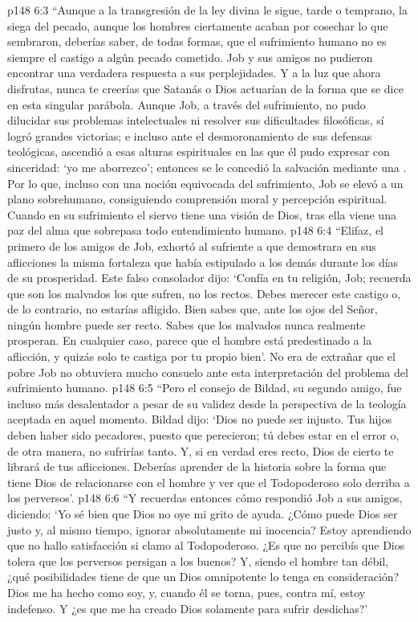 \vs p148 6:3 “Aunque a la transgresión de la ley divina le sigue, tarde o temprano, la siega del pecado, aunque los hombres ciertamente acaban por cosechar lo que sembraron, deberías saber, de todas formas, que el sufrimiento humano no es siempre el castigo a algún pecado cometido. Job y sus amigos no pudieron encontrar una verdadera respuesta a sus perplejidades. Y a la luz que ahora disfrutas, nunca te creerías que Satanás o Dios actuarían de la forma que se dice en esta singular parábola. Aunque Job, a través del sufrimiento, no pudo dilucidar sus problemas intelectuales ni resolver sus dificultades filosóficas, sí logró grandes victorias; e incluso ante el desmoronamiento de sus defensas teológicas, ascendió a esas alturas espirituales en las que él pudo expresar con sinceridad: ‘yo me aborrezco’; entonces se le concedió la salvación mediante una . Por lo que, incluso con una noción equivocada del sufrimiento, Job se elevó a un plano sobrehumano, consiguiendo comprensión moral y percepción espiritual. Cuando en su sufrimiento el siervo tiene una visión de Dios, tras ella viene una paz del alma que sobrepasa todo entendimiento humano.
\vs p148 6:4 “Elifaz, el primero de los amigos de Job, exhortó al sufriente a que demostrara en sus aflicciones la misma fortaleza que había estipulado a los demás durante los días de su prosperidad. Este falso consolador dijo: ‘Confía en tu religión, Job; recuerda que son los malvados los que sufren, no los rectos. Debes merecer este castigo o, de lo contrario, no estarías afligido. Bien sabes que, ante los ojos del Señor, ningún hombre puede ser recto. Sabes que los malvados nunca realmente prosperan. En cualquier caso, parece que el hombre está predestinado a la aflicción, y quizás solo te castiga por tu propio bien’. No era de extrañar que el pobre Job no obtuviera mucho consuelo ante esta interpretación del problema del sufrimiento humano.
\vs p148 6:5 “Pero el consejo de Bildad, su segundo amigo, fue incluso más desalentador a pesar de su validez desde la perspectiva de la teología aceptada en aquel momento. Bildad dijo: ‘Dios no puede ser injusto. Tus hijos deben haber sido pecadores, puesto que perecieron; tú debes estar en el error o, de otra manera, no sufrirías tanto. Y, si en verdad eres recto, Dios de cierto te librará de tus aflicciones. Deberías aprender de la historia sobre la forma que tiene Dios de relacionarse con el hombre y ver que el Todopoderoso solo derriba a los perversos’.
\vs p148 6:6 “Y recuerdas entonces cómo respondió Job a sus amigos, diciendo: ‘Yo sé bien que Dios no oye mi grito de ayuda. ¿Cómo puede Dios ser justo y, al mismo tiempo, ignorar absolutamente mi inocencia? Estoy aprendiendo que no hallo satisfacción si clamo al Todopoderoso. ¿Es que no percibís que Dios tolera que los perversos persigan a los buenos? Y, siendo el hombre tan débil, ¿qué posibilidades tiene de que un Dios omnipotente lo tenga en consideración? Dios me ha hecho como soy, y, cuando él se torna, pues, contra mí, estoy indefenso. Y ¿es que me ha creado Dios solamente para sufrir desdichas?’
